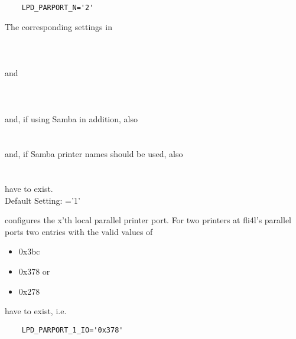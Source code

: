 \begin{description}
\begin{example}
\begin{verbatim}
    LPD_PARPORT_N='2'
\end{verbatim}
\end{example}

  The corresponding settings in\\
      \emph{}\\
      \emph{}\\
      \emph{}\\
  and\\
      \emph{}\\
      \emph{}\\
      \emph{}\\

  and, if using Samba in addition, also\\

      \emph{}\\
      \emph{}\\

  and, if Samba printer names should be used, also\\

      \emph{}\\
      \emph{}\\

  have to exist.\\

  Default Setting: ='1'



   configures the x'th local parallel printer port.
  For two printers at fli4l's parallel ports two entries with the valid values of

\begin{itemize}
\item 0x3bc
\item 0x378 or
\item 0x278
\end{itemize}

  have to exist, i.e.

\begin{example}
\begin{verbatim}
    LPD_PARPORT_1_IO='0x378'
\end{verbatim}
\end{example}


\end{description}
